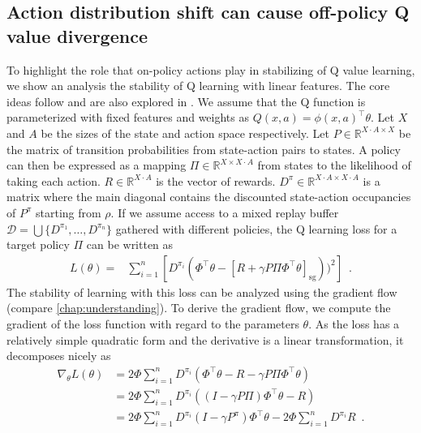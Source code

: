 \subsection{Action distribution shift can cause off-policy Q value divergence}
\label{sec:mad:theory}
To highlight the role that on-policy actions play in stabilizing of Q value learning, we show an analysis the stability of Q learning with linear features.
The core ideas follow \textcite{sutton2016emphatic} and are also explored in \textcite{tsitsiklis1996analysis,sutton1988learning}.
We assume that the Q function is parameterized with fixed features and weights as $Q(x,a) = \phi(x,a)^\top \theta$.
Let $X$ and $A$ be the sizes of the state and action space respectively. Let $P \in \mathbb{R}^{X\cdot A \times X}$ be the matrix of transition probabilities from state-action pairs to states.
A policy can then be expressed as a mapping $\Pi \in \mathbb{R}^{X\times X\cdot A}$ from states to the likelihood of taking each action.
$R \in \mathbb{R}^{X\cdot A}$ is the vector of rewards.
$D^{\pi} \in \mathbb{R}^{X\cdot A \times X\cdot A}$ is a matrix where the main diagonal contains the discounted state-action occupancies of $P^\pi$ starting from $\rho$.
If we assume access to a mixed replay buffer $\mathcal{D} = \bigcup \{D^{\pi_1}, \dots, D^{\pi_n}\}$ gathered with different policies, the Q learning loss for a target policy $\Pi$ can be written as
\begin{align}
    L(\theta) = & \sum_{i=1}^n \left[D^{\pi_i}\left(\Phi^\top \theta - [R + \gamma P\Pi \Phi^\top \theta]_\mathrm{sg}\right))^2\right] \enspace.
\end{align}
The stability of learning with this loss can be analyzed using the gradient flow (compare \autoref{chap:understanding}).
To derive the gradient flow, we compute the gradient of the loss function with regard to the parameters $\theta$.
As the loss has a relatively simple quadratic form and the derivative is a linear transformation, it decomposes nicely as
\begin{align}
    \nabla_\theta L(\theta) &= 2 \Phi \sum_{i=1}^n D^{\pi_i} \left(\Phi^\top \theta - R - \gamma P \Pi \Phi^\top \theta\right)\\
    &= 2 \Phi \sum_{i=1}^n D^{\pi_i} \left(\left(I - \gamma P \Pi \right)\Phi^\top \theta - R\right)\\
    &= 2 \Phi \sum_{i=1}^n D^{\pi_i} \left(I - \gamma P^\pi \right)\Phi^\top \theta - 2 \Phi \sum_{i=1}^n D^{\pi_i} R\enspace.
\end{align}

